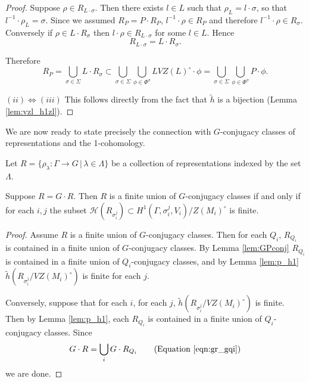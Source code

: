 \begin{proof}
  Suppose $\rho \in R_{L \cdot \sigma}$. Then there exists $l \in L$ such that $\rho_L = l \cdot \sigma$, so that $l^{-1} \cdot \rho_L = \sigma$. Since we assumed $R_P = P \cdot R_P$, $l^{-1} \cdot \rho \in R_P$ and therefore $l^{-1} \cdot \rho \in R_\sigma$. Conversely if $\rho \in L \cdot R_\sigma$ then $l \cdot \rho \in R_{L \cdot \sigma}$ for some $l \in L$. Hence
  \begin{displaymath}
    R_{L \cdot \sigma} = L \cdot R_\sigma.
  \end{displaymath}

  Therefore
  \begin{displaymath}
    R_P = \bigcup_{\sigma \in \Sigma} L \cdot R_\sigma \subset \bigcup_{\sigma \in \Sigma}\bigcup_{\phi \in \Phi^\sigma} LVZ(L)^\circ \cdot \phi = \bigcup_{\sigma \in \Sigma}\bigcup_{\phi \in \Phi^\sigma} P \cdot \phi.
  \end{displaymath}

  $(ii) \Leftrightarrow (iii)$ This follows directly from the fact that $\tilde{h}$ is a bijection (Lemma \ref{lem:vzl_h1zl}).

\end{proof}

We are now ready to state precisely the connection with $G$-conjugacy classes of representations and the 1-cohomology.

\begin{theorem}
  Let $R=\{\rho_\lambda:\Gamma\rightarrow G\,|\,\lambda \in \Lambda\}$ be a collection of representations indexed by the set $\Lambda$. 
  
  Suppose $R = G \cdot R$. Then $R$ is a finite union of $G$-conjugacy classes if and only if for each $i, j$ the subset $\mathcal{H}(R_{\sigma_i^j}) \subset H^1(\Gamma, \sigma_i^j, V_i) / Z(M_i)^\circ$ is finite.
  \label{thm:g_h1}
\end{theorem}
\begin{proof}
  Assume $R$ is a finite union of $G$-conjugacy classes. Then for each $Q_i$, $R_{Q_i}$ is contained in a finite union of $G$-conjugacy classes. By Lemma \ref{lem:GPconj} $R_{Q_i}$ is contained in a finite union of $Q_i$-conjugacy classes, and by Lemma \ref{lem:p_h1} $\tilde{h}(R_{\sigma_i^j}/VZ(M_i)^\circ)$ is finite for each $j$.

  Conversely, suppose that for each $i$, for each $j$, $\tilde{h}(R_{\sigma_i^j}/VZ(M_i)^\circ)$ is finite. Then by Lemma \ref{lem:p_h1}, each $R_{Q_i}$ is contained in a finite union of $Q_i$-conjugacy classes. Since
  \begin{displaymath}
    G \cdot R = \bigcup_i G \cdot R_{Q_i} \qquad (\textrm{Equation }\ref{eqn:gr_gqi})
  \end{displaymath}
  we are done.
\end{proof}

